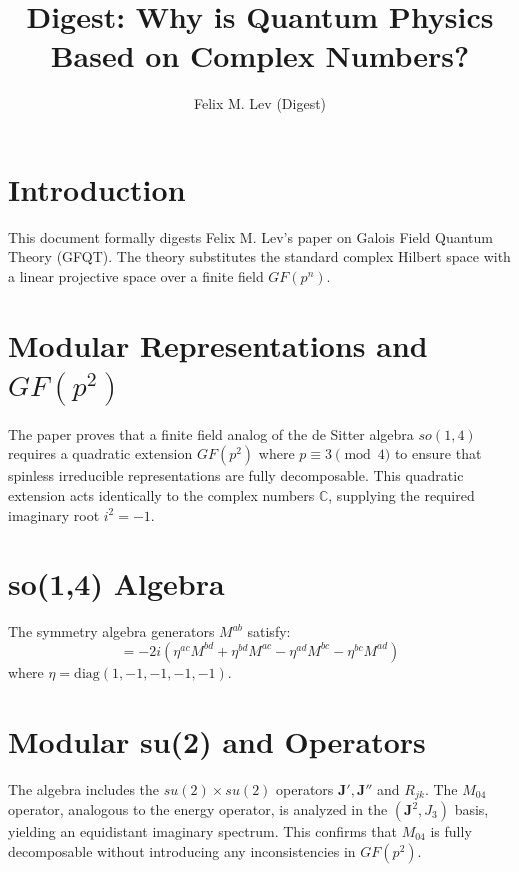\documentclass{article}
\begin{document}
\title{Digest: Why is Quantum Physics Based on Complex Numbers?}
\author{Felix M. Lev (Digest)}
\maketitle

\section{Introduction}
This document formally digests Felix M. Lev's paper on Galois Field Quantum Theory (GFQT). The theory substitutes the standard complex Hilbert space with a linear projective space over a finite field $GF(p^n)$. 

\section{Modular Representations and $GF(p^2)$}
The paper proves that a finite field analog of the de Sitter algebra $so(1,4)$ requires a quadratic extension $GF(p^2)$ where $p \equiv 3 \pmod 4$ to ensure that spinless irreducible representations are fully decomposable. 
This quadratic extension acts identically to the complex numbers $\mathbb{C}$, supplying the required imaginary root $i^2 = -1$.

\section{so(1,4) Algebra}
The symmetry algebra generators $M^{ab}$ satisfy:
\begin{equation}
[M^{ab}, M^{cd}] = -2i(\eta^{ac}M^{bd} + \eta^{bd}M^{ac} - \eta^{ad}M^{bc} - \eta^{bc}M^{ad})
\end{equation}
where $\eta = \text{diag}(1, -1, -1, -1, -1)$.

\section{Modular su(2) and Operators}
The algebra includes the $su(2) \times su(2)$ operators $\mathbf{J}', \mathbf{J}''$ and $R_{jk}$. The $M_{04}$ operator, analogous to the energy operator, is analyzed in the $(\mathbf{J}^2, J_3)$ basis, yielding an equidistant imaginary spectrum. This confirms that $M_{04}$ is fully decomposable without introducing any inconsistencies in $GF(p^2)$.
\end{document}
